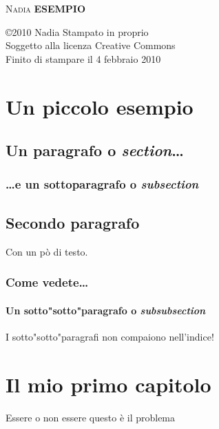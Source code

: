 \documentclass [a4paper,12pt,openany]{book}
\begin{document}
\pagestyle{empty}
\setlength{\parindent}{0pt} %
\setlength{\parskip}{6pt} %
\noindent

\begin{minipage}[c][\textheight][c]{\textwidth}\centering
\textsc{\Large Nadia}
\vfill
\textbf{\Huge ESEMPIO}
\vfill
\Large{}
\end{minipage}

\newpage

\begin{minipage}[c][\textheight][c]{\textwidth}
\copyright2010 Nadia
\vspace{20mm}
Stampato in proprio\\
Soggetto alla licenza Creative Commons\\
Finito di stampare il 4 febbraio 2010
\end{minipage}
\newpage

\pagestyle{plain}
\tableofcontents

\listoffigures

\chapter{Un piccolo esempio}
\section{Un paragrafo o {\em section}\ldots}
\subsection{\ldots e un sottoparagrafo o {\em subsection}}
\section{Secondo paragrafo}
Con un pò di testo.
\subsection{Come vedete\ldots}
\subsubsection{Un sotto"sotto"paragrafo o {\em subsubsection}}
I sotto"sotto"paragrafi non compaiono nell'indice!

\chapter{Il mio primo capitolo}
Essere o non essere questo è il problema
\end{document}
